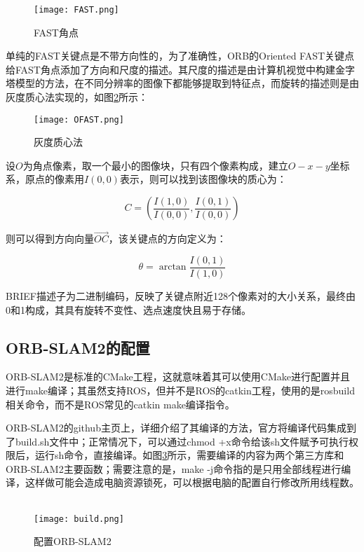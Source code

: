 \begin{figure}[!ht]
	\centering
	\texttt{[image: FAST.png]}
	\caption{FAST角点} 
	\label{fig7}
\end{figure}

单纯的FAST关键点是不带方向性的，为了准确性，ORB的Oriented FAST关键点给FAST角点添加了方向和尺度的描述。其尺度的描述是由计算机视觉中构建金字塔模型的方法，在不同分辨率的图像下都能够提取到特征点，而旋转的描述则是由灰度质心法实现的，如图\ref{fig8}所示：

\begin{figure}[!ht]
	\centering
	\texttt{[image: OFAST.png]}
	\caption{灰度质心法}
	\label{fig8}
\end{figure}

设$O$为角点像素，取一个最小的图像块，只有四个像素构成，建立$O-x-y$坐标系，原点的像素用$I(0,0)$表示，则可以找到该图像块的质心为：

\begin{equation}
C=(\frac{I(1,0)}{I(0,0)}, \frac{I(0,1)}{I(0,0)})
\end{equation}

则可以得到方向向量$\vec{OC}$，该关键点的方向定义为：

\begin{equation}
\theta = \arctan{\frac{I(0,1)}{I(1,0)}}
\end{equation}


BRIEF描述子为二进制编码，反映了关键点附近128个像素对的大小关系，最终由0和1构成，其具有旋转不变性、选点速度快且易于存储。


\subsection{ORB-SLAM2的配置}
ORB-SLAM2是标准的CMake工程，这就意味着其可以使用CMake进行配置并且进行make编译；其虽然支持ROS，但并不是ROS的catkin工程，使用的是rosbuild相关命令，而不是ROS常见的catkin make编译指令。

ORB-SLAM2的github主页上，详细介绍了其编译的方法，官方将编译代码集成到了build.sh文件中；正常情况下，可以通过chmod +x命令给该sh文件赋予可执行权限后，运行sh命令，直接编译。如图\ref{fig10}所示，需要编译的内容为两个第三方库和ORB-SLAM2主要函数；需要注意的是，make -j命令指的是只用全部线程进行编译，这样做可能会造成电脑资源锁死，可以根据电脑的配置自行修改所用线程数。
~\\
\begin{figure}[!ht]
	\centering
	\texttt{[image: build.png]}
	\caption{配置ORB-SLAM2}
	\label{fig10}
\end{figure}

